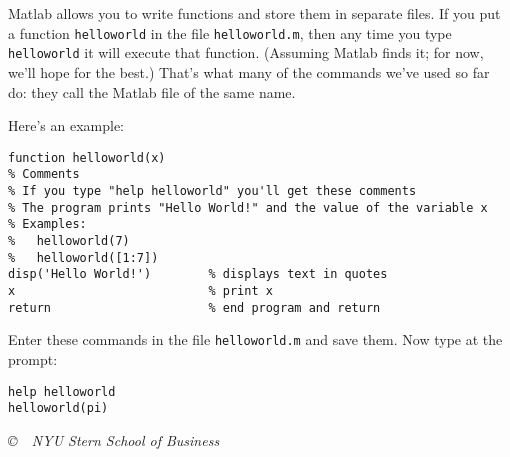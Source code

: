 \documentclass[11pt]{exam}
\begin{document}
\begin{questions}

Matlab allows you to write functions and store them in separate files.
If you put a function {\tt helloworld} in the file {\tt helloworld.m},
then any time you type  {\tt helloworld} it will execute that function.
(Assuming Matlab finds it; for now, we'll hope for the best.)
That's what many of the commands we've used so far do:
they call the Matlab file of the same name.

Here's an example:
\begin{verbatim}
function helloworld(x)
% Comments
% If you type "help helloworld" you'll get these comments
% The program prints "Hello World!" and the value of the variable x
% Examples:
%   helloworld(7)
%   helloworld([1:7])
disp('Hello World!')        % displays text in quotes
x                           % print x
return                      % end program and return
\end{verbatim}
Enter these commands in the file {\tt helloworld.m} and save them.
Now type at the prompt:
\begin{verbatim}
help helloworld
helloworld(pi)
\end{verbatim}

\end{questions}

\vfill \centerline{\it \copyright \ \number\year \
NYU Stern School of Business}
\end{document}
